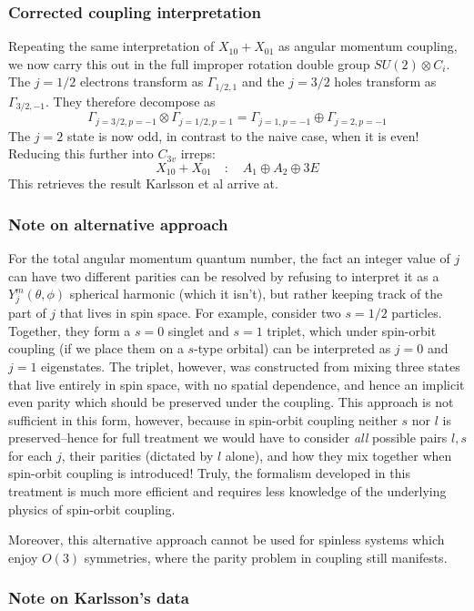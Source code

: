\documentclass[12pt]{article}
\begin{document}
	\subsubsection{Corrected coupling interpretation}
	Repeating the same interpretation of $X_{10}+X_{01}$ as angular momentum coupling, we now carry this out in the full improper rotation double group $SU(2)\otimes C_i$. The $j=1/2$ electrons transform as $\Gamma_{1/2,1}$ and the $j=3/2$ holes transform as $\Gamma_{3/2, -1}$. They therefore decompose as
	$$\Gamma_{j=3/2,p=-1}\otimes \Gamma_{j=1/2, p=1} = \Gamma_{j=1, p=-1}\oplus \Gamma_{j=2, p=-1}$$
	The $j=2$ state is now odd, in contrast to the naive case, when it is even! Reducing this further into $C_{3v}$ irreps:
	$$X_{10} + X_{01} \quad : \quad A_1 \oplus A_2 \oplus 3E$$
	This retrieves the result Karlsson et al arrive at.
	
	\subsubsection{Note on alternative approach}
	For the total angular momentum quantum number, the fact an integer value of $j$ can have two different parities can be resolved by refusing to interpret it as a $Y_j^m(\theta, \phi)$ spherical harmonic (which it isn't), but rather keeping track of the part of $j$ that lives in spin space. For example, consider two $s=1/2$ particles. Together, they form a $s=0$ singlet and $s=1$ triplet, which under spin-orbit coupling (if we place them on a $s$-type orbital) can be interpreted as $j=0$ and $j=1$ eigenstates. The triplet, however, was constructed from mixing three states that live entirely in spin space, with no spatial dependence, and hence an implicit even parity which should be preserved under the coupling. This approach is not sufficient in this form, however, because in spin-orbit coupling neither $s$ nor $l$ is preserved--hence for full treatment we would have to consider \textit{all} possible pairs $l,s$ for each $j$, their parities (dictated by $l$ alone), and how they mix together when spin-orbit coupling is introduced! Truly, the formalism developed in this treatment is much more efficient and requires less knowledge of the underlying physics of spin-orbit coupling.
	
	Moreover, this alternative approach cannot be used for spinless systems which enjoy $O(3)$ symmetries, where the parity problem in coupling still manifests.
	
	\subsubsection{Note on Karlsson's data}
	
\end{document}
